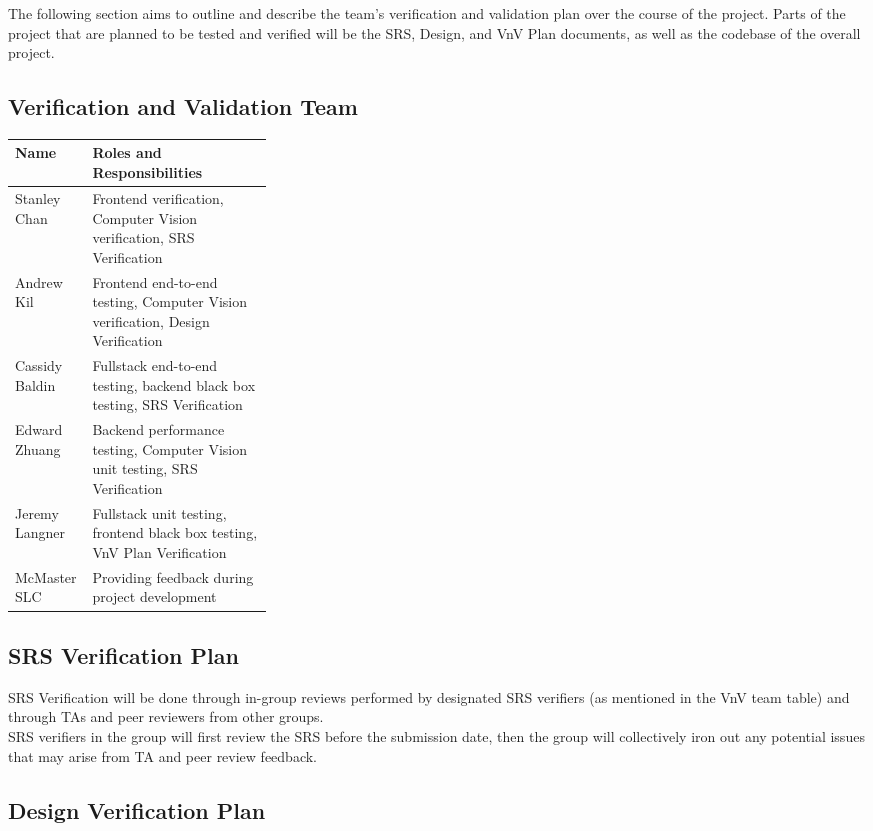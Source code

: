 \documentclass[12pt, titlepage]{article}
\begin{document}
The following section aims to outline and describe the team's verification and validation plan over the course of the project. Parts of
the project that are planned to be tested and verified will be the SRS, Design, and VnV Plan documents, as well as the codebase of the
overall project.

\subsection{Verification and Validation Team} \label{VnV_Team}

\begin{tabularx}{\textwidth}{p{0.3\linewidth} | X}
  \toprule
  Name & Roles and Responsibilities \\
  \hline
  Stanley Chan & Frontend verification, Computer Vision verification, SRS Verification \\
  Andrew Kil & Frontend end-to-end testing, Computer Vision verification, Design Verification \\
  Cassidy Baldin & Fullstack end-to-end testing, backend black box testing, SRS Verification \\
  Edward Zhuang & Backend performance testing, Computer Vision unit testing, SRS Verification \\
  Jeremy Langner & Fullstack unit testing, frontend black box testing, VnV Plan Verification \\

  McMaster SLC & Providing feedback during project development \\
  \bottomrule
\end{tabularx}

\subsection{SRS Verification Plan}

SRS Verification will be done through in-group reviews performed by designated SRS verifiers (as mentioned in the VnV team table)
and through TAs and peer reviewers from other groups. \\
SRS verifiers in the group will first review the SRS before the submission date, then the group will collectively iron out any
potential issues that may arise from TA and peer review feedback.

\subsection{Design Verification Plan}
\end{document}

